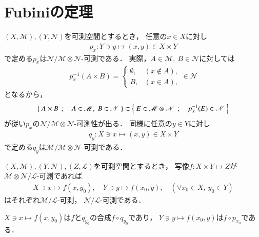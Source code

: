 \section{Fubiniの定理}
	$(X,\mathscr{M}),(Y,\mathscr{N})$を可測空間とするとき，
	任意の$x \in X$に対し
	\begin{align}
		p_x:Y \ni y \longmapsto (x,y) \in X \times Y
	\end{align}
	で定める$p_x$は$\mathscr{N}/\mathscr{M} \otimes \mathscr{N}$-可測である．
	実際，$A \in \mathscr{M},\ B \in \mathscr{N}$に対しては
	\begin{align}
		p_x^{-1}(A \times B) = 
		\begin{cases}
			\emptyset, & (x \notin A), \\
			B, & (x \in A),
		\end{cases}
		\in \mathscr{N}
	\end{align}
	となるから，
	\begin{align}
		\left\{\ A \times B\ \, ; \quad A \in \mathscr{M},\ B \in \mathscr{N}\ \right\}
		\subset \left\{\ E \in \mathscr{M} \otimes \mathscr{N}\ \, ; \quad p_x^{-1}(E) \in \mathscr{N}\ \right\}
	\end{align}
	が従い$p_x$の$\mathscr{N}/\mathscr{M} \otimes \mathscr{N}$-可測性が出る．
	同様に任意の$y \in Y$に対し
	\begin{align}
		q_y:X \ni x \longmapsto (x,y) \in X \times Y
	\end{align}
	で定める$q_y$は$\mathscr{M}/\mathscr{M} \otimes \mathscr{N}$-可測である．
	
	\begin{screen}
		\begin{lem}[二変数可測写像は片変数で可測]
			$(X,\mathscr{M}),(Y,\mathscr{N}),(Z,\mathscr{L})$を可測空間とするとき，
			写像$f: X \times Y \longmapsto Z$が
			$\mathscr{M}\otimes \mathscr{N}/ \mathscr{L}$-可測であれば
			\begin{align}
				X \ni x \longmapsto f(x,y_0),
				\quad Y \ni y \longmapsto f(x_0,y),
				\quad (\forall x_0 \in X,\ y_0 \in Y)
			\end{align}
			はそれぞれ$\mathscr{M}/\mathscr{L}$-可測，
			$\mathscr{N}/\mathscr{L}$-可測である．
		\end{lem}
	\end{screen}
	
	\begin{prf}
		$X \ni x \longmapsto f(x,y_0)$は$f$と$q_{y_0}$の合成$f \circ q_{y_0}$であり，
		$Y \ni y \longmapsto f(x_0,y)$は$f \circ p_{x_0}$である．
		\QED
	\end{prf}
	
